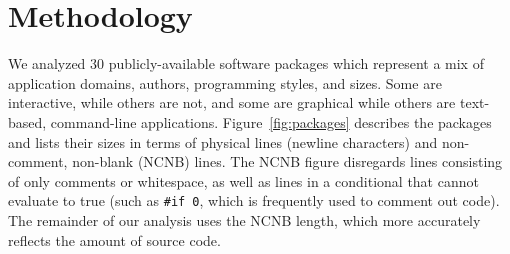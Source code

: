 \documentclass[10pt]{article}
\def\numpackages{30}
\begin{document}
%
%
%
%






\section{Methodology}
\label{sec:methodology}

We analyzed {\numpackages} publicly-available software packages which
represent a mix of application domains, authors, programming styles, and
sizes.  Some are interactive, while others are not, and some are graphical
while others are text-based, command-line applications.
Figure~\ref{fig:packages} describes the packages and lists their sizes in
terms of physical lines (newline characters) and non-comment, non-blank
(NCNB) lines.  The NCNB figure disregards lines consisting of only comments
or whitespace, as well as lines in a conditional that cannot evaluate to
true (such as {\tt \#if 0}, which is frequently used to comment out code).  The
remainder of our analysis uses the NCNB length, which more accurately
reflects the amount of source code.
\end{document}
